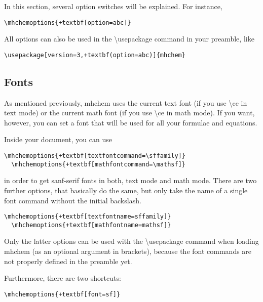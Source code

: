 \documentclass[a4paper,notitlepage]{scrreprt}
\newcommand\macro[1]{{\ttfamily\textbackslash#1}}
\begin{document}
In this section, several option switches will be explained. For instance,

\begin{Verbatim}[commandchars=+\[\]]
  \mhchemoptions{+textbf[option=abc]}
\end{Verbatim}

\noindent
All options can also be used in the \macro{usepackage} command in your preamble, like

\begin{Verbatim}[commandchars=+()]
  \usepackage[version=3,+textbf(option=abc)]{mhchem}
\end{Verbatim}


\subsection{Fonts} \label{sec:Fonts}

As mentioned previously, mhchem uses the current text font (if you use \macro{ce} in text mode) or the  current math font (if you use \macro{ce} in math mode). If you want, however, you can set a font that will be used for all your formulae and equations.

\medskip

\noindent
Inside your document, you can use

\begin{Verbatim}[commandchars=+\[\]]
  \mhchemoptions{+textbf[textfontcommand=\sffamily]}
  \mhchemoptions{+textbf[mathfontcommand=\mathsf]}
\end{Verbatim}

\noindent
in order to get sanf-serif fonts in both, text mode and math mode. There are two further options, that basically do the same, but only take the name of a single font command without the initial backslash.

\begin{Verbatim}[commandchars=+\[\]]
  \mhchemoptions{+textbf[textfontname=sffamily]}
  \mhchemoptions{+textbf[mathfontname=mathsf]}
\end{Verbatim}

\noindent
Only the latter options can be used with the \macro{usepackage} command when loading mhchem (as an optional argument in brackets), because the font commands are not properly defined in the preamble yet.

\medskip

\noindent
Furthermore, there are two shortcuts:

\begin{Verbatim}[commandchars=+\[\]]
  \mhchemoptions{+textbf[font=sf]}
\end{Verbatim}
\end{document}
